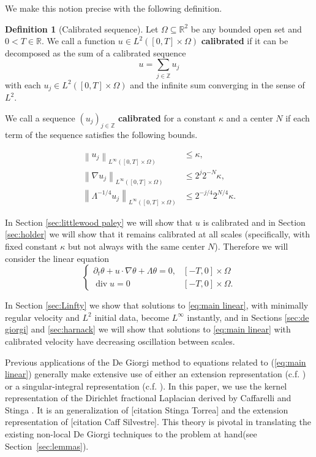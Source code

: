 \documentclass[11pt]{amsart}
\theoremstyle{remark}
\theoremstyle{definition}
\newtheorem{definition}{Definition}
\newcommand{\R}{\mathbb{R}}
\newcommand{\Z}{\mathbb{Z}}
\newcommand{\norm}[1]{\left\lVert#1\right\rVert}
\newcommand{\del}{\partial}
\newcommand{\grad}{\nabla}
\renewcommand{\div}{\operatorname{div}}
\begin{document}
We make this notion precise with the following definition.  

\begin{definition}[Calibrated sequence] \label{def:calibrated}
Let $\Omega\subseteq \R^2$ be any bounded open set and $0<T\in\R$.  We call a function $u\in L^2([0,T]\times\Omega)$ \textbf{calibrated} if it can be decomposed as the sum of a calibrated sequence
\[ u = \sum_{j \in \Z} u_j \]
with each $u_j \in L^2([0,T]\times\Omega)$ and the infinite sum converging in the sense of $L^2$.  

We call a sequence $(u_j)_{j\in\Z}$ \textbf{calibrated} for a constant $\kappa$ and a center $N$ if each term of the sequence satisfies the following bounds.  

\begin{align*}
\norm{u_j}_{L^\infty([0,T]\times\Omega)} &\leq \kappa, \\
\norm{\grad u_j}_{L^\infty([0,T]\times\Omega)} &\leq 2^{j} 2^{-N} \kappa, \\
\norm{\Lambda^{-1/4} u_j}_{L^\infty([0,T]\times\Omega)} &\leq 2^{-j/4} 2^{N/4} \kappa.  
\end{align*} 

\end{definition}

In Section \ref{sec:littlewood paley} we will show that $u$ is calibrated and in Section \ref{sec:holder} we will show that it remains calibrated at all scales (specifically, with fixed constant $\kappa$ but not always with the same center $N$).  Therefore we will consider the linear equation
\begin{equation} \label{eq:main linear} \begin{cases}
\del_t \theta + u \cdot \grad \theta + \Lambda \theta = 0, & [-T,0]\times\Omega \\
\div u = 0 & [-T,0]\times\Omega.
\end{cases} \end{equation}





In Section \ref{sec:Linfty} we show that solutions to \eqref{eq:main linear}, with minimally regular velocity and $L^2$ initial data, become $L^\infty$ instantly, and in Sections \ref{sec:de giorgi} and \ref{sec:harnack} we will show that solutions to \eqref{eq:main linear} with calibrated velocity have decreasing oscillation between scales.  


 Previous applications of the De Giorgi method to equations related to (\ref{eq:main linear}) generally make extensive use of either an extension representation (c.f. \cite{CaVa.sqg}) or a singular-integral representation (c.f. \cite{NoVa.qg}).  In this paper, we  use the kernel representation of  the Dirichlet fractional Laplacian  derived by Caffarelli and Stinga \cite{CaSt}. It is an generalization of   [citation Stinga Torrea] and \cite{CaSt} the extension representation of [citation Caff Silvestre]. 
 This theory is pivotal in translating the existing non-local De Giorgi techniques to the problem at hand(see Section~\ref{sec:lemmas}).  
\end{document}
